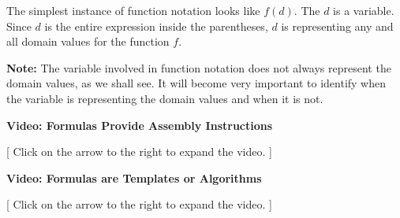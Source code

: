 \documentclass{ximera}
\begin{document}
The simplest instance of function notation looks like $f(d)$.  The $d$ is a variable.  Since $d$ is the entire expression inside the parentheses, $d$ is representing any and all domain values for the function $f$.


\textbf{Note:} The variable involved in function notation does not always represent the domain values, as we shall see. It will become very important to identify when the variable is representing the domain values and when it is not. 



\begin{explanation} \textbf{\textcolor{red!75!green}{Video: Formulas Provide Assembly Instructions}}

[ Click on the arrow to the right to expand the video. ]
\begin{expandable} 

\begin{center}
\end{center}

\end{expandable}
\end{explanation}



\begin{explanation} \textbf{\textcolor{red!75!green}{Video: Formulas are Templates or Algorithms}}

[ Click on the arrow to the right to expand the video. ]
\begin{expandable} 

\begin{center}
\end{center}

\end{expandable}
\end{explanation}
\end{document}
